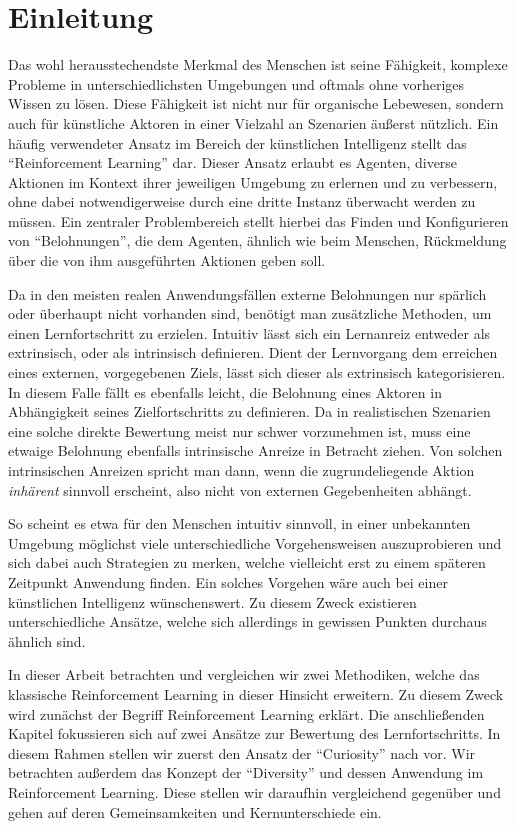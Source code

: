 \section{Einleitung}
\label{sec:intro}
Das wohl herausstechendste Merkmal des Menschen ist seine Fähigkeit, komplexe Probleme in unterschiedlichsten Umgebungen und oftmals ohne vorheriges Wissen zu lösen.
Diese Fähigkeit ist nicht nur für organische Lebewesen, sondern auch für künstliche Aktoren in einer Vielzahl an Szenarien äußerst nützlich.
Ein häufig verwendeter Ansatz im Bereich der künstlichen Intelligenz stellt das ``Reinforcement Learning'' dar. Dieser Ansatz erlaubt es Agenten, diverse Aktionen im Kontext ihrer jeweiligen Umgebung zu erlernen und zu verbessern, ohne dabei notwendigerweise durch eine dritte Instanz überwacht werden zu müssen.\cite{reinforcement_learning_kaelbling} 
Ein zentraler Problembereich stellt hierbei das Finden und Konfigurieren von ``Belohnungen'', die dem Agenten, ähnlich wie beim Menschen, Rückmeldung über die von ihm ausgeführten Aktionen geben soll.

Da in den meisten realen Anwendungsfällen externe Belohnungen nur spärlich oder überhaupt nicht vorhanden sind, benötigt man zusätzliche Methoden, um einen Lernfortschritt zu erzielen.\cite{reachability_savinov}
Intuitiv lässt sich ein Lernanreiz entweder als extrinsisch, oder als intrinsisch definieren. Dient der Lernvorgang dem erreichen eines externen, vorgegebenen Ziels, lässt sich dieser als extrinsisch kategorisieren. In diesem Falle fällt es ebenfalls leicht, die Belohnung eines Aktoren in Abhängigkeit seines Zielfortschritts zu definieren. 
Da in realistischen Szenarien eine solche direkte Bewertung meist nur schwer vorzunehmen ist, muss eine etwaige Belohnung ebenfalls intrinsische Anreize in Betracht ziehen. Von solchen intrinsischen Anreizen spricht man dann, wenn die zugrundeliegende Aktion \textit{inhärent} sinnvoll erscheint, also nicht von  externen Gegebenheiten abhängt.

So scheint es etwa für den Menschen intuitiv sinnvoll, in einer unbekannten Umgebung möglichst viele unterschiedliche Vorgehensweisen auszuprobieren und sich dabei auch Strategien zu merken, welche vielleicht erst zu einem späteren Zeitpunkt Anwendung finden. Ein solches Vorgehen wäre auch bei einer künstlichen Intelligenz wünschenswert. Zu diesem Zweck existieren unterschiedliche Ansätze, welche sich allerdings in gewissen Punkten durchaus ähnlich sind.

In dieser Arbeit betrachten und vergleichen wir zwei Methodiken, welche das klassische Reinforcement Learning in dieser Hinsicht erweitern.
Zu diesem Zweck wird zunächst der Begriff Reinforcement Learning erklärt.
Die anschließenden Kapitel fokussieren sich auf zwei Ansätze zur Bewertung des Lernfortschritts.
In diesem Rahmen stellen wir zuerst den Ansatz der ``Curiosity'' nach \cite{curiosity_schmidhuber} vor. 
Wir betrachten außerdem das Konzept der ``Diversity'' und dessen Anwendung im Reinforcement Learning.
Diese stellen wir daraufhin vergleichend gegenüber und gehen auf deren Gemeinsamkeiten und Kernunterschiede ein.

